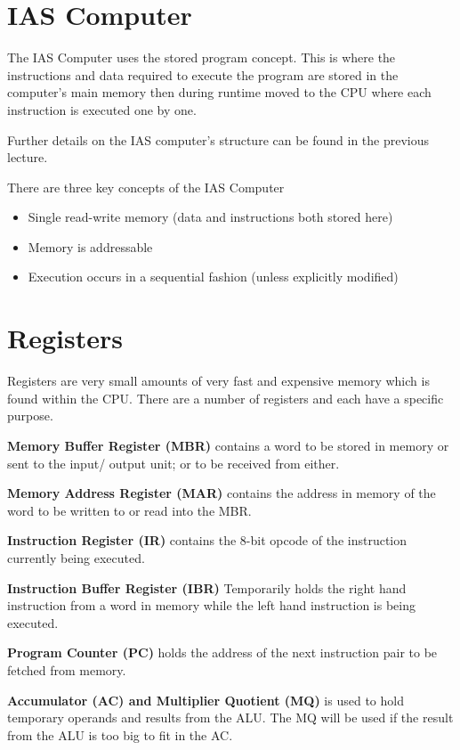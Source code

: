 
\section*{IAS Computer}
The IAS Computer uses the stored program concept. This is where the instructions and data required to execute the program are stored in the computer's main memory then during runtime moved to the CPU where each instruction is executed one by one.

Further details on the IAS computer's structure can be found in the previous lecture. 

There are three key concepts of the IAS Computer
\begin{itemize}
    \item Single read-write memory (data and instructions both stored here)
    \item Memory is addressable
    \item Execution occurs in a sequential fashion (unless explicitly modified)
\end{itemize}

\section*{Registers}
Registers are very small amounts of very fast and expensive memory which is found within the CPU. There are a number of registers and each have a specific purpose. 

\textbf{Memory Buffer Register (MBR)} contains a word to be stored in memory or sent to the input/ output unit; or to be received from either.

\textbf{Memory Address Register (MAR)} contains the address in memory of the word to be written to or read into the MBR.

\textbf{Instruction Register (IR)} contains the 8-bit opcode of the instruction currently being executed.

\textbf{Instruction Buffer Register (IBR)} Temporarily holds the right hand instruction from a word in memory while the left hand instruction is being executed.

\textbf{Program Counter (PC)} holds the address of the next instruction pair to be fetched from memory.

\textbf{Accumulator (AC) and Multiplier Quotient (MQ)} is used to hold temporary operands and results from the ALU. The MQ will be used if the result from the ALU is too big to fit in the AC. 

